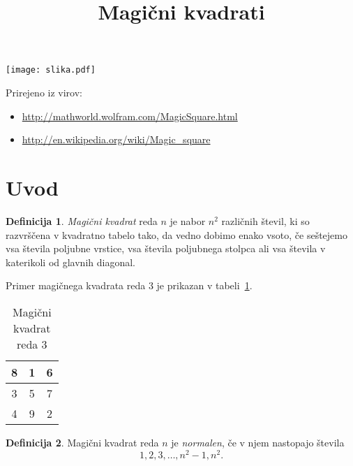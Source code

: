 \documentclass[a4paper,12pt]{article}
\title{Magični kvadrati}
\author{}
\date{}
\newcommand{\pojem}[1]{\emph{\color{purple}#1}}
\theoremstyle{definition}
\newtheorem{definicija}{Definicija}
\theoremstyle{plain}
\newenvironment{magic}[3]
{
   \begin{table}[!ht]
      \centering
      \caption{#2}
      \label{#3}
      \large
      \begin{tabular}{|*{#1}{c|}}
      \hline
}
{
      \end{tabular}
      \normalsize
   \end{table}
}
\begin{document}

\maketitle

\begin{center}
   \texttt{[image: slika.pdf]}
\end{center}

Prirejeno iz virov:
%
\begin{itemize}
   \item \url{http://mathworld.wolfram.com/MagicSquare.html}
   \item \url{http://en.wikipedia.org/wiki/Magic_square}
\end{itemize}

\tableofcontents


\newpage

\section{Uvod}

\begin{definicija}
   \pojem{Magični kvadrat} reda $n$ je nabor $n^2$ različnih števil,
   ki so razvrščena v kvadratno tabelo tako, da vedno dobimo enako vsoto,
   če seštejemo vsa števila poljubne vrstice, vsa števila poljubnega
   stolpca ali vsa števila v katerikoli od glavnih diagonal.
\end{definicija}

Primer magičnega kvadrata reda 3 je prikazan v tabeli~\ref{table:mag3}.

\begin{magic}{3}{Magični kvadrat reda 3}{table:mag3}
   8 & 1 & 6 \\\hline
   3 & 5 & 7 \\\hline
   4 & 9 & 2 \\\hline
\end{magic}

\begin{definicija}
   Magični kvadrat reda $n$ je \pojem{normalen}, če v njem nastopajo števila
   \begin{equation}
      \label{eq:numbers}
      1, 2, 3, \ldots, n^2-1, n^2.
   \end{equation}
\end{definicija}
\end{document}
